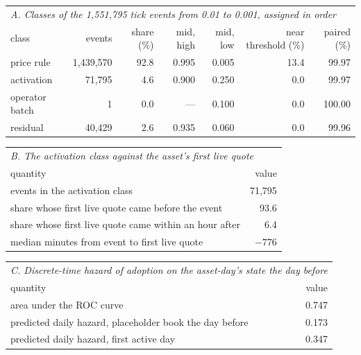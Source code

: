 \begin{table}[htbp]
\centering\scriptsize\setlength{\tabcolsep}{3pt}
\begin{tabular}{lrrrrrr}
\toprule
\multicolumn{7}{l}{\emph{A. Classes of the 1{,}551{,}795 tick events from 0.01 to 0.001, assigned in order}} \\
class & events & share (\%) & mid, high & mid, low & near threshold (\%) & paired (\%) \\
\midrule
price rule & 1{,}439{,}570 & 92.8 & 0.995 & 0.005 & 13.4 & 99.97 \\
activation & 71{,}795 & 4.6 & 0.900 & 0.250 & 0.0 & 99.97 \\
operator batch & 1 & 0.0 & --- & 0.100 & 0.0 & 100.00 \\
residual & 40{,}429 & 2.6 & 0.935 & 0.060 & 0.0 & 99.96 \\
\bottomrule
\end{tabular}
\vspace{4pt}

\begin{tabular}{lr}
\toprule
\multicolumn{2}{l}{\emph{B. The activation class against the asset's first live quote}} \\
quantity & value \\
\midrule
events in the activation class & 71{,}795 \\
share whose first live quote came before the event & 93.6 \\
share whose first live quote came within an hour after & 6.4 \\
median minutes from event to first live quote & $-776$ \\
\bottomrule
\end{tabular}
\vspace{4pt}

\begin{tabular}{lr}
\toprule
\multicolumn{2}{l}{\emph{C. Discrete-time hazard of adoption on the asset-day's state the day before}} \\
quantity & value \\
\midrule
area under the ROC curve & 0.747 \\
predicted daily hazard, placeholder book the day before & 0.173 \\
predicted daily hazard, first active day & 0.347 \\
\bottomrule
\end{tabular}
\vspace{4pt}


\end{table}
